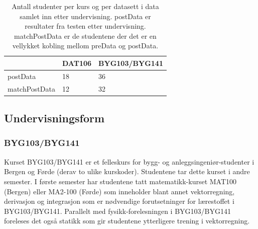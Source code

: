\documentclass[a4paper,norsk,12pt]{article}
\begin{document}
\begin{table}[tp]
\begin{tabularx}{\textwidth}{|*{3}{Y|}}
\hline
& DAT106 & BYG103/BYG141 \\
\hline
postData & 18 & 36\\
\hline
matchPostData & 12 & 32 \\
\hline
\end{tabularx}
\caption{Antall studenter per kurs og per datasett i data samlet inn etter undervisning. postData er resultater fra testen etter undervisning. matchPostData er de studentene der det er en vellykket kobling mellom preData og postData.}
\label{tab:postdata}
\end{table}

\subsection{Undervisningsform}
\subsubsection{BYG103/BYG141}
Kurset BYG103/BYG141 er et felleskurs for bygg- og anleggsingeniør-studenter i Bergen og Førde (derav to ulike kurskoder). Studentene tar dette kurset i andre semester. I første semester har studentene tatt matematikk-kurset MAT100 (Bergen) eller MA2-100 (Førde) som inneholder blant annet vektorregning, derivasjon og integrasjon som er nødvendige forutsetninger for lærestoffet i BYG103/BYG141. Parallelt med fysikk-forelesningen i BYG103/BYG141 foreleses det også statikk som gir studentene ytterligere trening i vektorregning.
\end{document}
